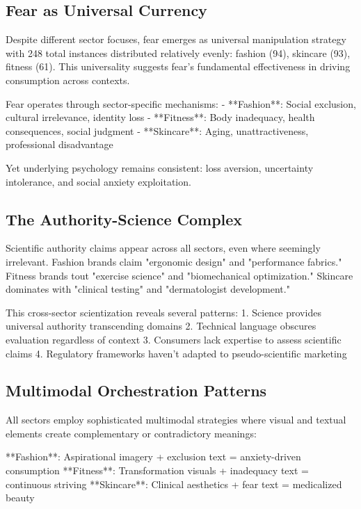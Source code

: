 \subsection{Fear as Universal Currency}

Despite different sector focuses, fear emerges as universal manipulation strategy with 248 total instances distributed relatively evenly: fashion (94), skincare (93), fitness (61). This universality suggests fear's fundamental effectiveness in driving consumption across contexts.

Fear operates through sector-specific mechanisms:
- **Fashion**: Social exclusion, cultural irrelevance, identity loss
- **Fitness**: Body inadequacy, health consequences, social judgment
- **Skincare**: Aging, unattractiveness, professional disadvantage

Yet underlying psychology remains consistent: loss aversion, uncertainty intolerance, and social anxiety exploitation.

\subsection{The Authority-Science Complex}

Scientific authority claims appear across all sectors, even where seemingly irrelevant. Fashion brands claim "ergonomic design" and "performance fabrics." Fitness brands tout "exercise science" and "biomechanical optimization." Skincare dominates with "clinical testing" and "dermatologist development."

This cross-sector scientization reveals several patterns:
1. Science provides universal authority transcending domains
2. Technical language obscures evaluation regardless of context
3. Consumers lack expertise to assess scientific claims
4. Regulatory frameworks haven't adapted to pseudo-scientific marketing

\subsection{Multimodal Orchestration Patterns}

All sectors employ sophisticated multimodal strategies where visual and textual elements create complementary or contradictory meanings:

**Fashion**: Aspirational imagery + exclusion text = anxiety-driven consumption
**Fitness**: Transformation visuals + inadequacy text = continuous striving
**Skincare**: Clinical aesthetics + fear text = medicalized beauty

